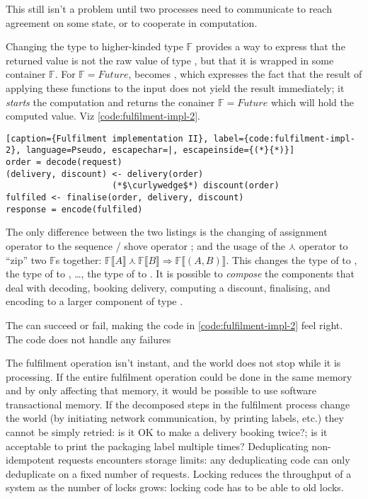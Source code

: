 \documentclass[10 pt, twocolumn]{article}
\begin{document}
This still isn't a problem until two processes need to communicate to reach agreement on some state, or to cooperate in computation. 



Changing the type  to higher-kinded type $\mathds{F}$ provides a way to express that the returned value is not the raw value of type , but that it is wrapped in some container $\mathds{F}$. For $\mathds{F} = Future$,  becomes , which expresses the fact that the result of applying these functions to the input does not yield the result immediately; it \emph{starts} the computation and returns the conainer $\mathds{F} = Future$ which will hold the computed value. Viz \autoref{code:fulfilment-impl-2}.

\begin{lstlisting}[caption={Fulfilment implementation II}, label={code:fulfilment-impl-2}, language=Pseudo, escapechar=|, escapeinside={(*}{*)}]
order = decode(request)
(delivery, discount) <- delivery(order) 
                     (*$\curlywedge$*) discount(order)
fulfiled <- finalise(order, delivery, discount)
response = encode(fulfiled)
\end{lstlisting}

The only difference between the two listings is the changing of assignment operator \pcode{=} to the sequence / shove operator \pcode{<-}; and the usage of the $\curlywedge$ operator to ``zip'' two $\mathds{F}$s together: $\mathds{F}\lBrack{}A\rBrack \curlywedge \mathds{F}\lBrack{}B\rBrack \Rightarrow \mathds{F}\lBrack(A, B)\rBrack$. This changes the type of  to , the type of  to , \ldots, the type of  to . It is possible to \emph{compose} the components that deal with decoding, booking delivery, computing a discount, finalising, and encoding to a larger component of type .


The  can succeed or fail, making the code in \autoref{code:fulfilment-impl-2} feel right. The code does not handle any failures

The fulfilment operation isn't instant, and the world does not stop while it is processing. If the entire fulfilment operation could be done in the same memory and by only affecting that memory, it would be possible to use software transactional memory\cite{stm}. If the decomposed steps in the fulfilment process change the world (by initiating network communication, by printing labels, etc.) they cannot be simply retried: is it OK to make a delivery booking twice?; is it acceptable to print the packaging label multiple times? Deduplicating non-idempotent requests encounters storage limits: any deduplicating code can only deduplicate on a fixed number of requests. Locking reduces the throughput of a system as the number of locks grows: locking code has to be able to old locks. 
\end{document}
